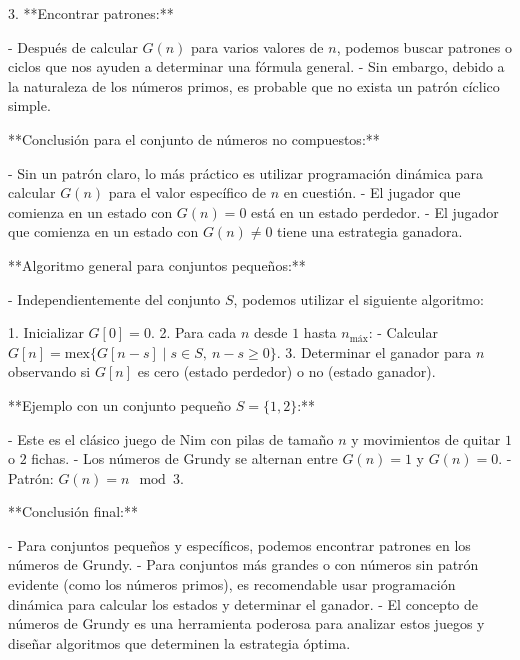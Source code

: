 \documentclass[11pt]{scrartcl}
\begin{document}
\begin{problem}
\begin{hint}
\begin{solu}
3. **Encontrar patrones:**

   - Después de calcular $G(n)$ para varios valores de $n$, podemos buscar patrones o ciclos que nos ayuden a determinar una fórmula general.
   - Sin embargo, debido a la naturaleza de los números primos, es probable que no exista un patrón cíclico simple.

**Conclusión para el conjunto de números no compuestos:**

- Sin un patrón claro, lo más práctico es utilizar programación dinámica para calcular $G(n)$ para el valor específico de $n$ en cuestión.
- El jugador que comienza en un estado con $G(n) = 0$ está en un estado perdedor.
- El jugador que comienza en un estado con $G(n) \neq 0$ tiene una estrategia ganadora.

**Algoritmo general para conjuntos pequeños:**

- Independientemente del conjunto $S$, podemos utilizar el siguiente algoritmo:

  1. Inicializar $G[0] = 0$.
  2. Para cada $n$ desde $1$ hasta $n_{\text{máx}}$:
     - Calcular $G[n] = \text{mex}\{ G[n - s] \mid s \in S,\ n - s \geq 0 \}$.
  3. Determinar el ganador para $n$ observando si $G[n]$ es cero (estado perdedor) o no (estado ganador).

**Ejemplo con un conjunto pequeño $S = \{1, 2\}$:**

- Este es el clásico juego de Nim con pilas de tamaño $n$ y movimientos de quitar $1$ o $2$ fichas.
- Los números de Grundy se alternan entre $G(n) = 1$ y $G(n) = 0$.
- Patrón: $G(n) = n \mod 3$.

**Conclusión final:**

- Para conjuntos pequeños y específicos, podemos encontrar patrones en los números de Grundy.
- Para conjuntos más grandes o con números sin patrón evidente (como los números primos), es recomendable usar programación dinámica para calcular los estados y determinar el ganador.
- El concepto de números de Grundy es una herramienta poderosa para analizar estos juegos y diseñar algoritmos que determinen la estrategia óptima.
\end{solu}
\end{hint}
\end{problem}
\end{document}
